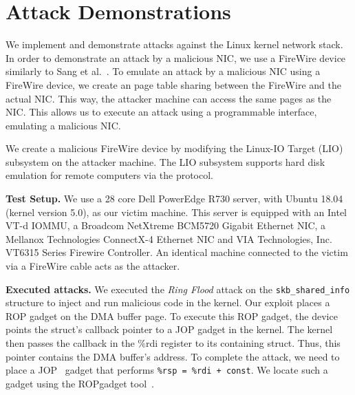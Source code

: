 \section{Attack Demonstrations}\label{Sec:setup}


We implement and demonstrate \compound attacks against the Linux kernel network stack. 
In order to demonstrate an attack by a malicious NIC, we use a FireWire device similarly to Sang et al.~\cite{SLND10}. To emulate an attack by a malicious NIC using a FireWire device, we create an \iova{} page table sharing between the FireWire and the actual NIC. This way, the attacker machine can access the same pages as the NIC. This allows us to execute an attack using a programmable interface, emulating a malicious NIC.


We create a malicious FireWire device by modifying the Linux-IO Target (LIO) subsystem on the attacker machine. The LIO subsystem supports hard disk emulation for remote computers via the \spb{} protocol. 

\smallskip
\noindent\textbf{Test Setup.}
We use a 28 core Dell PowerEdge R730 server, with Ubuntu 18.04 (kernel version 5.0), as our victim machine. This server is equipped with an Intel VT-d IOMMU, a Broadcom NetXtreme BCM5720 Gigabit Ethernet NIC, a Mellanox Technologies ConnectX-4 Ethernet NIC and VIA Technologies, Inc. VT6315 Series Firewire Controller. An identical machine connected to the victim via a FireWire cable acts as the attacker. 

\smallskip
\noindent\textbf{Executed attacks.}
We executed the \textit{Ring Flood} attack on the \texttt{skb\_shared\_info} structure to inject and run malicious code in the kernel.
Our exploit places a ROP gadget on the DMA buffer page. To execute this ROP gadget, the device points the struct's callback pointer to a JOP gadget in the kernel. The kernel then passes the callback in the \%rdi register to its containing struct. Thus, this pointer contains the DMA buffer's address. 
To complete the attack, we need to place a JOP~\cite{BJFL11} gadget that performs \texttt{\%rsp = \%rdi + const}. We locate such a gadget using the ROPgadget tool~\cite{ROPgadget}.


